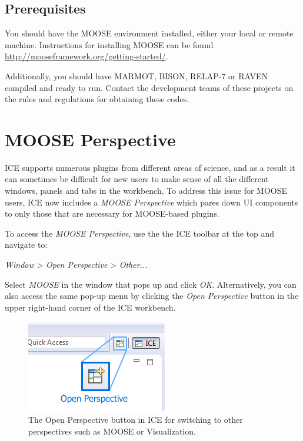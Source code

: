 \subsection{Prerequisites}\label{prerequisites}

You should have the MOOSE environment installed, either your local or
remote machine. Instructions for installing MOOSE can be found
\url{http://mooseframework.org/getting-started/}.

Additionally, you should have MARMOT, BISON, RELAP-7 or RAVEN compiled
and ready to run. Contact the development teams of these projects on the
rules and regulations for obtaining these codes.

\section{MOOSE Perspective}\label{moose-perspective}

ICE supports numerous plugins from different areas of science, and as a
result it can sometimes be difficult for new users to make sense of all
the different windows, panels and tabs in the workbench. To address this
issue for MOOSE users, ICE now includes a \emph{MOOSE Perspective} which
pares down UI components to only those that are necessary for
MOOSE-based plugins.

To access the \emph{MOOSE Perspective}, use the the ICE toolbar at the
top and navigate to:

\emph{Window} \textgreater{} \emph{Open Perspective} \textgreater{}
\emph{Other...}

Select \emph{MOOSE} in the window that pops up and click \emph{OK}.
Alternatively, you can also access the same pop-up menu by clicking the
\emph{Open Perspective} button in the upper right-hand corner of the ICE
workbench.

\begin{figure}[htbp]
\centering
\includegraphics{figures/ICE_OpenPerspective.png}
\caption{The Open Perspective button in ICE for switching to other perspectives such as MOOSE or Visualization.}
\end{figure}

